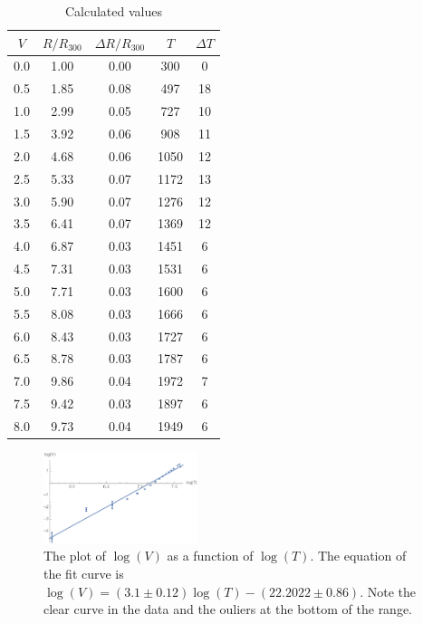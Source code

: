 \documentclass[%
 reprint,
superscriptaddress,
 amsmath,amssymb,
 aps,
]{revtex4-1}
\begin{document}
\begin{table}
\begin{tabular}{ccccc}
    \hline \hline
$V$ & $R/R_{300}$ & $\Delta R/R_{300}$ & $T$ & $\Delta T$ \\\hline
0.0 & 1.00 & 0.00 & 300 & 0 \\
0.5 & 1.85 & 0.08 & 497 & 18 \\
1.0 & 2.99 & 0.05 & 727 & 10 \\
1.5 & 3.92 & 0.06 & 908 & 11 \\
2.0 & 4.68 & 0.06 & 1050 & 12 \\
2.5 & 5.33 & 0.07 & 1172 & 13 \\
3.0 & 5.90 & 0.07 & 1276 & 12 \\
3.5 & 6.41 & 0.07 & 1369 & 12 \\
4.0 & 6.87 & 0.03 & 1451 & 6 \\
4.5 & 7.31 & 0.03 & 1531 & 6 \\
5.0 & 7.71 & 0.03 & 1600 & 6 \\
5.5 & 8.08 & 0.03 & 1666 & 6 \\
6.0 & 8.43 & 0.03 & 1727 & 6 \\
6.5 & 8.78 & 0.03 & 1787 & 6 \\
7.0 & 9.86 & 0.04 & 1972 & 7 \\
7.5 & 9.42 & 0.03 & 1897 & 6 \\
8.0 & 9.73 & 0.04 & 1949 & 6 \\ \hline \hline
\end{tabular}
    \caption{Calculated values}
    \label{ht-calcs}
\end{table}

\begin{figure}
    \includegraphics[width=0.4\textwidth]{floats/hightemp-graph}
    \caption{The plot of $\log(V)$ as a function of $\log(T)$. The equation of the fit curve is
    $
        \log(V) = (3.1\pm0.12) \log(T) - (22.2022\pm0.86).
    $
    Note the clear curve in the data and the ouliers at the bottom of the range.
    }
    \label{HT-graph}
\end{figure}
\end{document}
